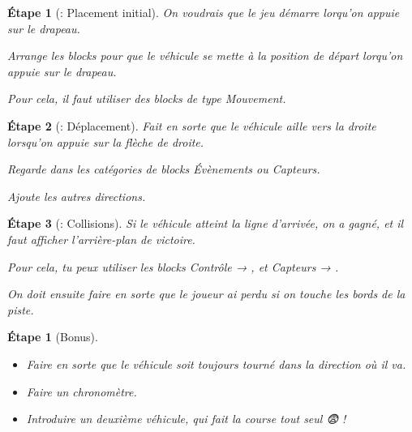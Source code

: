 \documentclass[a4paper,11pt]{article}
\theoremstyle{etape_style}
\newtheorem{etape}{Étape}
\newtheorem*{etape*}{Étape}
\begin{document}
\begin{etape}[: Placement initial]
	On voudrais que le jeu démarre lorqu'on appuie sur le drapeau.

	Arrange les blocks pour que le véhicule se mette à la position de départ lorqu'on appuie sur le drapeau.

	Pour cela, il faut utiliser des blocks de type \textit{Mouvement}.
\end{etape}

\begin{etape}[: Déplacement]
	Fait en sorte que le véhicule aille vers la droite lorsqu'on appuie sur la flèche de droite.

	\begin{palebox}[frametitle={\textit{Indice} :}]
		Regarde dans les catégories de blocks \textit{Évènements} ou \textit{Capteurs}.
	\end{palebox}

	Ajoute les autres directions.
\end{etape}

\begin{etape}[: Collisions]
	Si le véhicule atteint la ligne d'arrivée, on a gagné, et il faut afficher l'arrière-plan de victoire.

	Pour cela, tu peux utiliser les blocks \textit{Contrôle} → , et \textit{Capteurs} → . \vspace{1em}

	On doit ensuite faire en sorte que le joueur ai perdu si on touche les bords de la piste.
\end{etape}

\begin{etape*}[Bonus]\

	\begin{itemize}
		\item Faire en sorte que le véhicule soit toujours tourné dans la direction où il va.
		\item Faire un chronomètre.
		\item Introduire un deuxième véhicule, qui fait la course tout seul 😨 !
	\end{itemize}
\end{etape*}
\end{document}
